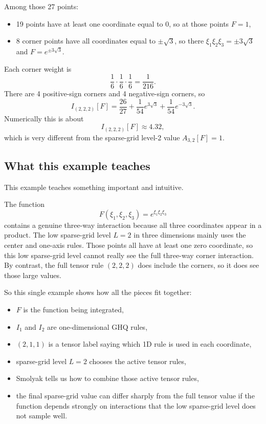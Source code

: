 \documentclass[11pt]{article}
\begin{document}
Among those 27 points:
\begin{itemize}[leftmargin=0.28in]
  \item 19 points have at least one coordinate equal to 0, so at those points
  \(F=1\),
  \item 8 corner points have all coordinates equal to \(\pm\sqrt3\), so there
  \(\xi_1\xi_2\xi_3=\pm 3\sqrt3\) and
  \(F=e^{\pm 3\sqrt3}\).
\end{itemize}
Each corner weight is
\begin{equation}
  \frac16\cdot\frac16\cdot\frac16 = \frac1{216}.
  \label{eq:corner-weight}
\end{equation}
There are 4 positive-sign corners and 4 negative-sign corners, so
\begin{equation}
  I_{(2,2,2)}[F]
  =
  \frac{26}{27}+\frac{1}{54}e^{3\sqrt3}+\frac{1}{54}e^{-3\sqrt3}.
  \label{eq:I222-example}
\end{equation}
Numerically this is about
\begin{equation}
  I_{(2,2,2)}[F]\approx 4.32,
  \label{eq:I222-example-numeric}
\end{equation}
which is very different from the sparse-grid level-2 value
\(A_{3,2}[F]=1\).

\subsection{What this example teaches}

This example teaches something important and intuitive.

The function
\[
  F(\xi_1,\xi_2,\xi_3)=e^{\xi_1\xi_2\xi_3}
\]
contains a genuine three-way interaction because all three coordinates appear in
a product.  The low sparse-grid level \(L=2\) in three dimensions mainly uses the
center and one-axis rules.  Those points all have at least one zero coordinate,
so this low sparse-grid level cannot really see the full three-way corner
interaction.  By contrast, the full tensor rule \((2,2,2)\) does include the
corners, so it does see those large values.

So this single example shows how all the pieces fit together:
\begin{itemize}[leftmargin=0.28in]
  \item \(F\) is the function being integrated,
  \item \(I_1\) and \(I_2\) are one-dimensional GHQ rules,
  \item \((2,1,1)\) is a tensor label saying which 1D rule is used in each
  coordinate,
  \item sparse-grid level \(L=2\) chooses the active tensor rules,
  \item Smolyak tells us how to combine those active tensor rules,
  \item the final sparse-grid value can differ sharply from the full tensor value
  if the function depends strongly on interactions that the low sparse-grid level
  does not sample well.
\end{itemize}
\end{document}
